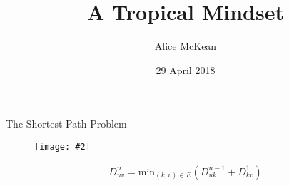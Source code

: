 \documentclass[usenames,dvipsnames]{beamer}
\title{A Tropical Mindset}
\date{29 April 2018}
\author{Alice McKean}
\institute{Reed Math 201}
\newcommand{\pic}[2]{\texttt{[image: \#2]}}
\begin{document}
\maketitle

\begin{frame}{The Shortest Path Problem}
  \begin{figure}
    \pic{1}{shortest-path.png}
  \end{figure}
  \begin{align*}
    D_{u v}^n =\text{min}_{(k, v) \in E}(D_{u k}^{n-1} + D_{k v}^1)
  \end{align*}
\end{frame}
\end{document}
